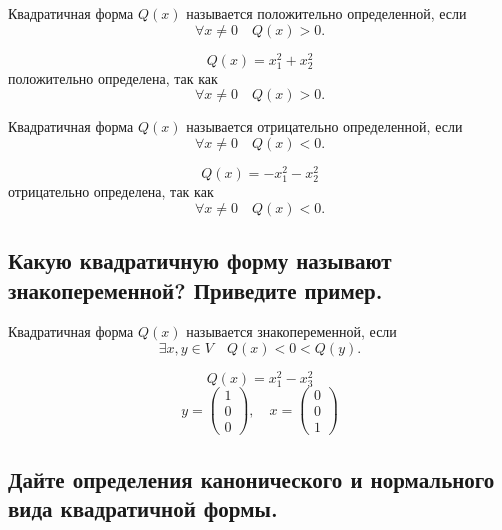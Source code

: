\begin{definition}
    Квадратичная форма $Q(x)$ называется положительно определенной, если
    \[
        \forall x \neq 0\quad Q(x) > 0.
    \]
\end{definition}

\begin{example}
    \[
        Q(x) = x_1^2 + x_2^2
    \]
    положительно определена, так как
    \[
        \forall x \neq 0\quad Q(x) > 0.
    \]
\end{example}

\begin{definition}
    Квадратичная форма $Q(x)$ называется отрицательно определенной, если
    \[
        \forall x \neq 0\quad Q(x) < 0.
    \]
\end{definition}
\begin{example}
    \[
        Q(x) = -x_1^2 - x_2^2
    \]
    отрицательно определена, так как
    \[
        \forall x \neq 0\quad Q(x) < 0.
    \]
\end{example}

\subsection{Какую квадратичную форму называют знакопеременной? Приведите пример.}

\begin{definition}
    Квадратичная форма $Q(x)$ называется знакопеременной, если
    \[
        \exists x, y \in V\quad Q(x) < 0 < Q(y).
    \]
\end{definition}

\begin{example}
    \[
        Q(x) = x_1^2 - x_3^2
    \]
    \[
        y =
        \begin{pmatrix}
            1 \\
            0 \\
            0
        \end{pmatrix},
        \quad
        x =
        \begin{pmatrix}
            0 \\
            0 \\
            1
        \end{pmatrix}
    \]
\end{example}


\subsection{Дайте определения канонического и нормального вида квадратичной формы.}

